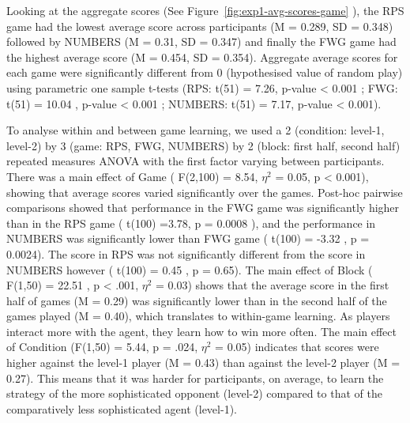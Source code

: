 \documentclass[man,floatsintext]{apa6}
\begin{document}
Looking at the aggregate scores (See Figure~\ref{fig:exp1-avg-scores-game} ), the RPS game had the lowest average score across participants (M = 0.289, SD = 0.348) followed by NUMBERS (M = 0.31, SD = 0.347) and finally the FWG game had the highest average score (M = 0.454, SD = 0.354). Aggregate average scores for each game were significantly different from 0 (hypothesised value of random play) using parametric one sample t-tests (RPS: t(51) = 7.26, p-value \textless{} 0.001 ; FWG: t(51) = 10.04 , p-value \textless{} 0.001 ; NUMBERS: t(51) = 7.17, p-value \textless{} 0.001).

To analyse within and between game learning, we used a 2 (condition: level-1, level-2) by 3 (game: RPS, FWG, NUMBERS) by 2 (block: first half, second half) repeated measures ANOVA with the first factor varying between participants. There was a main effect of Game ( F(2,100) = 8.54, \(\eta^{2}\) = 0.05, p \textless{} 0.001), showing that average scores varied significantly over the games. Post-hoc pairwise comparisons showed that performance in the FWG game was significantly higher than in the RPS game ( t(100) =3.78, p = 0.0008 ), and the performance in NUMBERS was significantly lower than FWG game ( t(100) = -3.32 , p = 0.0024). The score in RPS was not significantly different from the score in NUMBERS however ( t(100) = 0.45 , p = 0.65). The main effect of Block ( F(1,50) = 22.51 , p \textless{} .001, \(\eta^{2}\) = 0.03) shows that the average score in the first half of games (M = 0.29) was significantly lower than in the second half of the games played (M = 0.40), which translates to within-game learning. As players interact more with the agent, they learn how to win more often. The main effect of Condition (F(1,50) = 5.44, p = .024, \(\eta^{2}\) = 0.05) indicates that scores were higher against the level-1 player (M = 0.43) than against the level-2 player (M = 0.27). This means that it was harder for participants, on average, to learn the strategy of the more sophisticated opponent (level-2) compared to that of the comparatively less sophisticated agent (level-1).
\end{document}
